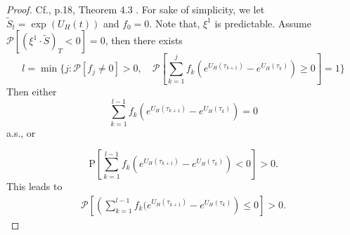 \documentclass[a4paper, twoside, 11pt]{article}
\theoremstyle{definition}
\newcommand{\brkt}[1]{\left({#1} \right)}
\begin{document}
  \begin{proof}
	  Cf.\cite{chridito}, p.18, Theorem 4.3 . For sake of simplicity, we let $\tilde{S}_t = \exp\brkt{ U_H(t)}$ and $f_0=0$. Note that, $\xi^1$ is predictable. %
	  Assume ${\mathcal{P}}[(\xi^1 \cdot \tilde{S})_T < 0] = 0$, then there exists 
	$$
	l = \min \{ j: \mathcal{P}[f_j \neq 0] > 0,\hspace{1em} \mathcal{P}[\sum_{k=1}^{j} f_k (e^{U_H(\tau_{k+1})} - e^{U_H(\tau_k)})\ge 0]=1 \}
	$$
	Then either 
	  $$
	  \sum_{k=1}^{l-1} f_k (e^{U_H(\tau_{k+1})} - e^{U_H(\tau_k)}) = 0
	  $$
	  a.s., or 

	  $$
	  \mathrm{P}[\sum_{k=1}^{l-1} f_k (e^{U_H(\tau_{k+1})} - e^{U_H(\tau_k)}) < 0] > 0 .
	  $$
	This leads to
	\begin{eqnarray*}
	  \mathcal{P} \left[\brkt{\sum_{k=1}^{l-1} f_k (e^{U_H(\tau_{k+1})} - e^{U_H(\tau_k)}} \le 0\right] > 0 .
	\end{eqnarray*}
	

\end{proof}
\end{document}

